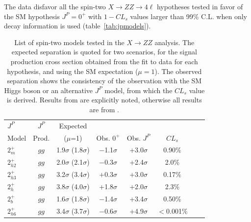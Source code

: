The data disfavor all the spin-two $X \to ZZ \to 4\ell$ hypotheses tested in favor of the SM hypothesis
$J^P=0^+$ with $1-CL_{s}$ values larger than 99\% C.L. when only decay information is used (table~\ref{tab:jpmodels}).

\begin{table}
\caption[List of spin-two models tested in the $X \to ZZ$ analysis.
The expected separation is quoted for two scenarios, for the signal production cross section
obtained from the fit to data for each hypothesis, and using the SM expectation ($\mu=1$).
The observed separation shows the consistency of the observation with the SM Higgs boson
or an alternative $J^{P}$ model, from which the $CL_{s}$ value is derived.]{
List of spin-two models tested in the $X \to ZZ$ analysis.
The expected separation is quoted for two scenarios, for the signal production cross section
obtained from the fit to data for each hypothesis, and using the SM expectation ($\mu=1$).
The observed separation shows the consistency of the observation with the SM Higgs boson
or an alternative $J^{P}$ model, from which the $CL_{s}$ value is derived.
Results from \cite{Chatrchyan:2013mxa} are explicitly noted, otherwise all results are from \cite{Khachatryan:2014kca}.
}
\centering
{\renewcommand{\arraystretch}{0.55}
\begin{tabular}{lccccccc}
$J^P$                           & $J^P$        &        Expected  &                       &                    &                \\
Model                           & Prod. &        ($\mu$=1) &  Obs. $0^+$  & Obs. $J^P$ & $CL_{s}$  \\
\hline
$2_{m}^+$~\cite{Chatrchyan:2013mxa}     & $gg$       &  1.9$\sigma$ (1.8$\sigma$)  & $-$1.1$\sigma$  & +3.0$\sigma$  &  0.90\% \\
$2^+_{h2}$ & $gg$         & 2.0$\sigma$ (2.1$\sigma$) & $-$0.3$\sigma$ & $+$2.4$\sigma$ & 2.0\%  \\
$2^+_{h3}$ & $gg$         & 3.2$\sigma$ (3.4$\sigma$) & $+$0.3$\sigma$ & $+$3.0$\sigma$ & 0.17\%  \\
$2_{h}^+$~\cite{Chatrchyan:2013mxa}      & $gg$       &  3.8$\sigma$ (4.0$\sigma$)  & +1.8$\sigma$    & +2.0$\sigma$  &  2.3\% \\
$2_{b}^+$~\cite{Chatrchyan:2013mxa}     & $gg$       &  1.6$\sigma$ (1.8$\sigma$)  & $-$1.4$\sigma$  & +3.4$\sigma$  &  0.50\% \\
$2^+_{h6}$ & $gg$         & 3.4$\sigma$ (3.7$\sigma$) & $-$0.6$\sigma$ & $+$4.9$\sigma$ & $<$0.001\% \\

\end{tabular}}
\end{table}
